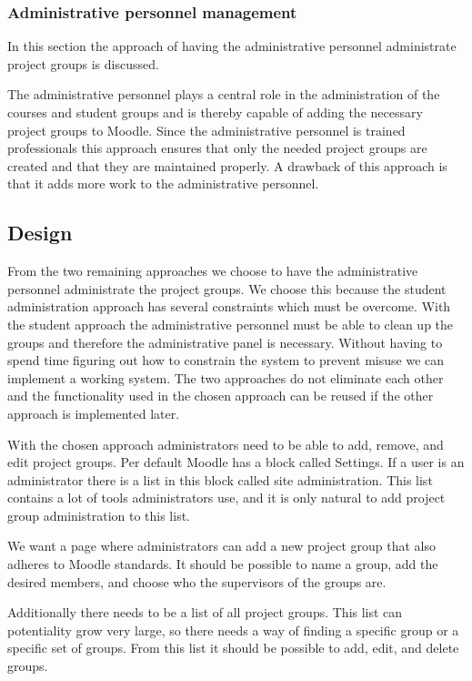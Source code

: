 \subsubsection{Administrative personnel management}
In this section the approach of having the administrative personnel administrate project groups is discussed. 

The administrative personnel plays a central role in the administration of the courses and student groups and is thereby capable of adding the necessary project groups to Moodle. 
Since the administrative personnel is trained professionals this approach ensures that only the needed project groups are created and that they are maintained properly. 
A drawback of this approach is that it adds more work to the administrative personnel.

\subsection{Design}
From the two remaining approaches we choose to have the administrative personnel administrate the project groups. 
We choose this because the student administration approach has several constraints which must be overcome. 
With the student approach the administrative personnel must be able to clean up the groups and therefore the administrative panel is necessary. 
Without having to spend time figuring out how to constrain the system to prevent misuse we can implement a working system.
The two approaches do not eliminate each other and the functionality used in the chosen approach can be reused if the other approach is implemented later.

With the chosen approach administrators need to be able to add, remove, and edit project groups.
Per default Moodle has a block called Settings. 
If a user is an administrator there is a list in this block called site administration. 
This list contains a lot of tools administrators use, and it is only natural to add project group administration to this list. 

We want a page where administrators can add a new project group that also adheres to Moodle standards.
It should be possible to name a group, add the desired members, and choose who the supervisors of the groups are.

Additionally there needs to be a list of all project groups.
This list can potentiality grow very large, so there needs a way of finding a specific group or a specific set of groups. 
From this list it should be possible to add, edit, and delete groups. 



